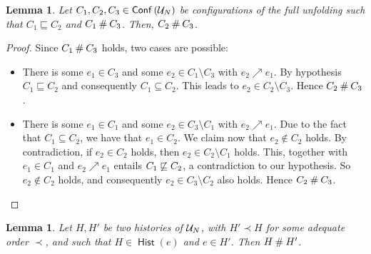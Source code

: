 \documentclass[12pt,a4paper]{article}
\newtheorem{lemma}[theorem]{Lemma}
\newcommand{\hist}[1]{\ensuremath{\mathop{\mathsf{Hist}}{(#1)}}}
\newcommand{\conf}[1]{\ensuremath{\mathop{\mathsf{Conf}}{(#1)}}}
\newcommand{\confl}{\ensuremath\mathbin\#}
\newcommand{\evolves}{\ensuremath{\sqsubseteq}}
\begin{document}
\begin{lemma}
\label{lem:be.configurations}
Let $C_1, C_2, C_3 \in \conf{\unf N}$ be configurations of the full unfolding
such that $C_1 \evolves C_2$ and $C_1 \confl C_3$.  Then, $C_2 \confl C_3$.
\end{lemma}
\begin{proof}
Since $C_1 \confl C_3$ holds, two cases are possible:

\begin{itemize}
\item There is some $e_1 \in C_3$ and some $e_2 \in C_1 \setminus C_3$ with
$e_2 \nearrow e_1$.  By hypothesis $C_1 \evolves C_2$ and consequently $C_1
\subseteq C_2$. This leads to $e_2 \in C_2 \setminus C_3$.  Hence $C_2 \confl
C_3$.

\item There is some $e_1 \in C_1$ and some $e_2 \in C_3 \setminus C_1$ with
$e_2 \nearrow e_1$.  Due to the fact that $C_1 \subseteq C_2$, we have that
$e_1 \in C_2$.  We claim now that $e_2 \not\in C_2$ holds.  By contradiction,
if $e_2 \in C_2$ holds, then $e_2 \in C_2 \setminus C_1$ holds.  This, together
with $e_1 \in C_1$ and $e_2 \nearrow e_1$ entails $C_1 \not\evolves C_2$, a
contradiction to our hypothesis.  So $e_2 \not\in C_2$ holds, and consequently
$e_2 \in C_3 \setminus C_2$ also holds.  Hence $C_2 \confl C_3$.
\end{itemize}
\end{proof}

\begin{lemma}
\label{lem:two.histories}
Let $H, H'$ be two histories of $\mathcal{U}_{N}$, with $H' \prec H$ for some adequate
order $\prec$, and such that $H \in \hist{e}$ and $e \in H'$.  Then $H \confl
H'$.
\end{lemma}
\end{document}

